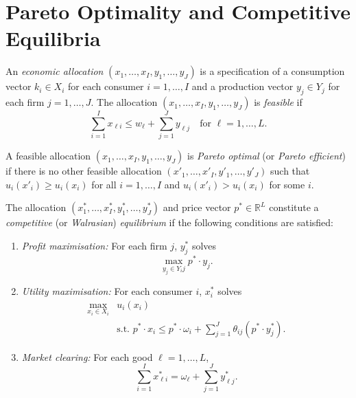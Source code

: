 \addtocounter{section}{1}

\section{Pareto Optimality and Competitive Equilibria}

\begin{defn}
    An \emph{economic allocation} $(x_1, \dots, x_I, y_1, \dots, y_J)$ is a specification of a consumption vector $k_i \in X_i$ for each consumer $i = 1, \dots, I$ and a production vector $y_j \in Y_j$ for each firm $j = 1, \dots, J$. The allocation $(x_1, \dots, x_I, y_1, \dots, y_J)$ is \emph{feasible} if 
    \begin{equation*}
        \sum_{i = 1}^I x_{\ell i} \leq w_\ell + \sum_{j = 1}^J y_{\ell j} \quad \text{for } \ell = 1, \dots, L.
    \end{equation*}
\end{defn}

\begin{defn}
    A feasible allocation $(x_1, \dots, x_I, y_1, \dots, y_J)$ is \emph{Pareto optimal} (or \emph{Pareto efficient}) if there is no other feasible allocation $(x'_1, \dots, x'_I, y'_1, \dots, y'_J)$ such that $u_i(x'_i) \geq u_i(x_i)$ for all $i = 1, \dots, I$ and $u_i(x'_i) > u_i(x_i)$ for some $i$.
\end{defn}

\begin{defn}
    The allocation $(x^*_1, \dots, x^*_I, y^*_1, \dots, y^*_J)$ and price vector $p^* \in \mathbb{R}^L$ constitute a \emph{competitive} (or \emph{Walrasian}) \emph{equilibrium} if the following conditions are satisfied:
    \begin{enumerate}
        \item 
        \emph{Profit maximisation:} For each firm $j$, $y^*_j$ solves
        \begin{equation}
            \max_{y_j \in Y_ij} p^* \cdot y_j.
        \end{equation}

        \item 
        \emph{Utility maximisation:} For each consumer $i$, $x^*_i$ solves
        \begin{equation}
            \begin{split}
                \max_{x_i \in X_i} &u_i(x_i) \\
                &\text{s.t. } p^* \cdot x_i \leq p^* \cdot \omega_i + \sum_{j = 1}^J \theta_{ij} (p^* \cdot y^*_j).
            \end{split}
        \end{equation}

        \item 
        \emph{Market clearing:} For each good $\ell = 1, \dots, L$,
        \begin{equation}\label{piii.chx.market-clearing}
            \sum_{i = 1}^I x^*_{\ell i} = \omega_\ell + \sum_{j = 1}^J y^*_{\ell j}.
        \end{equation}
    \end{enumerate}
\end{defn}

